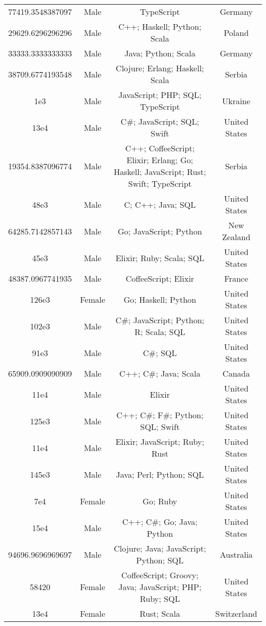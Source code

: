 \begin{center}
\begin{tabular}{ |c|c|c|c| }
77419.3548387097  &  Male  &  TypeScript  &  Germany  \\ 
29629.6296296296  &  Male  &  C++; Haskell; Python; Scala  &  Poland  \\ 
33333.3333333333  &  Male  &  Java; Python; Scala  &  Germany  \\ 
38709.6774193548  &  Male  &  Clojure; Erlang; Haskell; Scala  &  Serbia  \\ 
1e3  &  Male  &  JavaScript; PHP; SQL; TypeScript  &  Ukraine  \\ 
13e4  &  Male  &  C\#; JavaScript; SQL; Swift  &  United States  \\ 
19354.8387096774  &  Male  &  C++; CoffeeScript; Elixir; Erlang; Go; Haskell; JavaScript; Rust; Swift; TypeScript  &  Serbia  \\ 
48e3  &  Male  &  C; C++; Java; SQL  &  United States  \\ 
64285.7142857143  &  Male  &  Go; JavaScript; Python  &  New Zealand  \\ 
45e3  &  Male  &  Elixir; Ruby; Scala; SQL  &  United States  \\ 
48387.0967741935  &  Male  &  CoffeeScript; Elixir  &  France  \\ 
126e3  &  Female  &  Go; Haskell; Python  &  United States  \\ 
102e3  &  Male  &  C\#; JavaScript; Python; R; Scala; SQL  &  United States  \\ 
91e3  &  Male  &  C\#; SQL  &  United States  \\ 
65909.0909090909  &  Male  &  C++; C\#; Java; Scala  &  Canada  \\ 
11e4  &  Male  &  Elixir  &  United States  \\ 
125e3  &  Male  &  C++; C\#; F\#; Python; SQL; Swift  &  United States  \\ 
11e4  &  Male  &  Elixir; JavaScript; Ruby; Rust  &  United States  \\ 
145e3  &  Male  &  Java; Perl; Python; SQL  &  United States  \\ 
7e4  &  Female  &  Go; Ruby  &  United States  \\ 
15e4  &  Male  &  C++; C\#; Go; Java; Python  &  United States  \\ 
94696.9696969697  &  Male  &  Clojure; Java; JavaScript; Python; SQL  &  Australia  \\ 
58420  &  Female  &  CoffeeScript; Groovy; Java; JavaScript; PHP; Ruby; SQL  &  United States  \\ 
13e4  &  Female  &  Rust; Scala  &  Switzerland  \\ 

\end{tabular}
\end{center}
